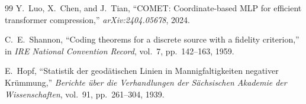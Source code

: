 \documentclass[11pt,a4paper]{article}
\begin{document}
\begin{thebibliography}{99}
	Y.~Luo, X.~Chen, and J.~Tian,
	``COMET: Coordinate-based MLP for efficient transformer compression,''
	\emph{arXiv:2404.05678}, 2024.

	C.~E.~Shannon,
	``Coding theorems for a discrete source with a fidelity criterion,''
	in \emph{IRE National Convention Record}, vol.~7, pp.~142--163, 1959.

	E.~Hopf,
	``Statistik der geodätischen Linien in Mannigfaltigkeiten negativer Krümmung,''
	\emph{Berichte über die Verhandlungen der Sächsischen Akademie der Wissenschaften},
	vol.~91, pp.~261--304, 1939.

\end{thebibliography}
\end{document}
